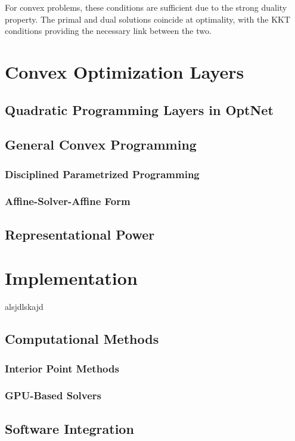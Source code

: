 \documentclass{article}
\begin{document}
For convex problems, these conditions are sufficient due to the strong duality property. The primal and dual solutions coincide at optimality, with the KKT conditions providing the necessary link between the two.

\section{Convex Optimization Layers}

\subsection{Quadratic Programming Layers in OptNet}

\subsection{General Convex Programming}
    \subsubsection{Disciplined Parametrized Programming}
    \subsubsection{Affine-Solver-Affine Form}
\subsection{Representational Power}

\section{Implementation}

alsjdlskajd
\subsection{Computational Methods}
    \subsubsection{Interior Point Methods}
    \subsubsection{GPU-Based Solvers}
\subsection{Software Integration}
\end{document}
